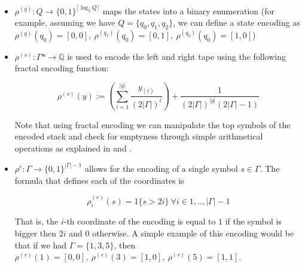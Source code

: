 \documentclass{article}
\begin{document}
\begin{itemize}
    \item $\rho^{(q)}: Q \rightarrow \{0,1\}^{\lceil \log_2 Q \rceil}$ maps the states into a binary enumeration (for example, assuming we have $Q=\{q_0,q_1,q_2\}$, we can define a state encoding as $\rho^{(q)}(q_0)=[0,0],\ \rho^{(q_1)}(q_0)=[0,1],\ \rho^{(q_2)}(q_0)=[1,0]$)
    \item $\rho^{(s)}: \Gamma* \to \mathbb{Q}$ is used to encode the left and right tape using the following fractal encoding function:

        \begin{equation}
            \rho^{(s)}(y) := \left(\sum_{i=1}^{|y|} \frac{y_{(i)}}{{(2|\Gamma|)^i}}\right) + \frac{1}{(2|\Gamma|)^{|y|}(2|\Gamma|-1)}
        \end{equation}

    Note that using fractal encoding we can manipulate the top symbols of the encoded stack and check for emptyness through simple arithmetical operations as explained in \cite{SIE95} and \cite{SIE995}.
    \item $\rho^{r}:\Gamma \rightarrow \{0,1\}^{|\Gamma|-1}$ allows for the encoding of a single symbol $s \in \Gamma$. The formula that defines each of the coordinates is

        \begin{equation}
            \rho^{(r)}_i(s) = 1\{s > 2i\}\ \forall i \in {1,..,|\Gamma|-1}
        \end{equation}

    That is, the $i$-th coordinate of the encoding is equal to $1$ if the symbol is bigger then $2i$ and $0$ otherwise. A simple example of this encoding would be that if we had $\Gamma=\{1,3,5\}$, then $\rho^{(r)}(1)=[0,0],\ \rho^{(r)}(3)=[1,0],\ \rho^{(r)}(5)=[1,1]$.
    
\end{itemize}

\end{document}
